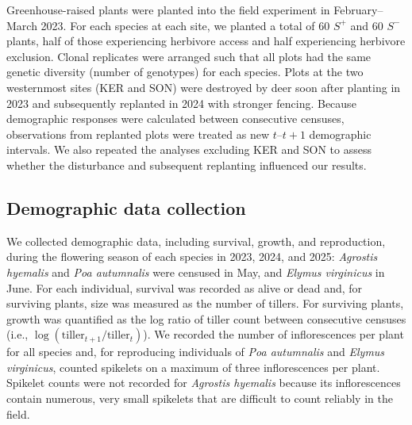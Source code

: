 \documentclass[12pt]{article}\usepackage[]{graphicx}\usepackage[dvipsnames]{xcolor}
\newcommand{\revise}[1]{{\color{Mahogany}{#1}}}
\begin{document}
Greenhouse-raised plants were planted into the field experiment in February--March 2023.
For each species at each site, we planted a total of 60 $S^+$ and 60 $S^-$ plants, half of those experiencing herbivore access and half experiencing herbivore exclusion. 
Clonal replicates were arranged such that all plots had the same genetic diversity (number of genotypes) for each species. 
Plots at the two westernmost sites (KER and SON) were destroyed by deer soon after planting in 2023 and subsequently replanted in 2024 with stronger fencing.
Because demographic responses were calculated between consecutive censuses, observations from replanted plots were treated as new $t$--$t+1$ demographic intervals. We also repeated the analyses excluding KER and SON to assess whether the disturbance and subsequent replanting influenced our results.


\subsection*{Demographic data collection}
We collected demographic data, including survival, growth, and reproduction, during the flowering season of each species in 2023, 2024, and 2025: \emph{Agrostis hyemalis} and \emph{Poa autumnalis} were censused in May, and \emph{Elymus virginicus} in June.
For each individual, survival was recorded as alive or dead and, for surviving plants, size was measured as the number of tillers.
For surviving plants, growth was quantified as the log ratio of tiller count between consecutive censuses (i.e., $\log(\text{tiller}_{t+1}/\text{tiller}_{t})$).
We recorded the number of inflorescences per plant for all species and, for reproducing individuals of \emph{Poa autumnalis} and \emph{Elymus virginicus}, counted spikelets on a maximum of three inflorescences per plant. Spikelet counts were not recorded for \emph{Agrostis hyemalis} because its inflorescences contain numerous, very small spikelets that are difficult to count reliably in the field.
\end{document}
